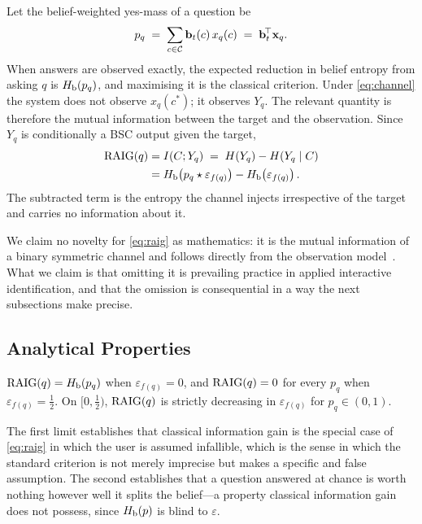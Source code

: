 Let the belief-weighted yes-mass of a question be
\begin{equation}
p_q \;=\; \sum_{c \in \mathcal{C}} \mathbf{b}_t(c)\, x_q(c) \;=\; \mathbf{b}_t^{\!\top} \mathbf{x}_q .
\end{equation}
When answers are observed exactly, the expected reduction in belief entropy
from asking $q$ is $H_{\mathrm{b}}(p_q)$, and maximising it is the classical criterion.
Under \eqref{eq:channel} the system does not observe $x_q(c^\ast)$; it observes
$Y_q$. The relevant quantity is therefore the mutual information between the
target and the observation. Since $Y_q$ is conditionally a BSC output given the
target,
\begin{align}
\mathrm{RAIG}(q)
&= I(C; Y_q) \;=\; H(Y_q) - H(Y_q \mid C) \nonumber\\
&= H_{\mathrm{b}}\!\left(p_q \star \varepsilon_{f(q)}\right) - H_{\mathrm{b}}\!\left(\varepsilon_{f(q)}\right).
\label{eq:raig}
\end{align}
The subtracted term is the entropy the channel injects irrespective of the
target and carries no information about it.

We claim no novelty for \eqref{eq:raig} as mathematics: it is the mutual
information of a binary symmetric channel and follows directly from the
observation model~\cite[Ch.~7]{cover2006}. What we claim is that omitting it
is prevailing practice in applied interactive identification, and that the
omission is consequential in a way the next subsections make precise.

\subsection{Analytical Properties}

\begin{proposition}
\label{prop:limits}
$\mathrm{RAIG}(q) = H_{\mathrm{b}}(p_q)$ when $\varepsilon_{f(q)}=0$, and $\mathrm{RAIG}(q)=0$ for every
$p_q$ when $\varepsilon_{f(q)}=\tfrac12$. On $[0,\tfrac12)$, $\mathrm{RAIG}(q)$ is
strictly decreasing in $\varepsilon_{f(q)}$ for $p_q \in (0,1)$.
\end{proposition}

The first limit establishes that classical information gain is the special case
of \eqref{eq:raig} in which the user is assumed infallible, which is the sense
in which the standard criterion is not merely imprecise but makes a specific
and false assumption. The second establishes that a question answered at chance
is worth nothing however well it splits the belief---a property classical
information gain does not possess, since $H_{\mathrm{b}}(p)$ is blind to $\varepsilon$.

